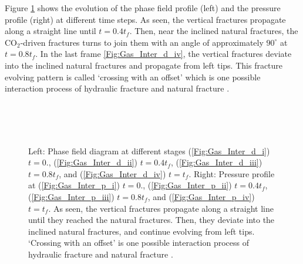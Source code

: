 {Figure \ref{Fig:Gas_Inter_snapshots} shows the evolution of the phase field profile (left) and the pressure profile (right) at different time steps. As seen, the vertical fractures propagate along a straight line until $t=0.4t_f$. Then, near the inclined natural fractures, the CO$_2$-driven fractures turns to join them with an angle of approximately $90^{\circ}$ at $t=0.8t_f$. In the last frame \ref{Fig:Gas_Inter_d_iv}, the vertical fractures deviate into the inclined natural fractures and propagate from left tips. This fracture evolving pattern is called `crossing with an offset' which is one possible interaction process of hydraulic fracture and natural fracture \cite{yew2014mechanics}.}

\begin{figure}[htbp]
\centering %
\\
\\
\\
\caption{{Left: Phase field diagram at different stages (\ref{Fig:Gas_Inter_d_i}) $t=0.$, (\ref{Fig:Gas_Inter_d_ii}) $t=0.4t_f$, (\ref{Fig:Gas_Inter_d_iii}) $t=0.8t_f$, and (\ref{Fig:Gas_Inter_d_iv}) $t=t_f$. Right: Pressure profile at (\ref{Fig:Gas_Inter_p_i}) $t=0.$, (\ref{Fig:Gas_Inter_p_ii}) $t=0.4t_f$, (\ref{Fig:Gas_Inter_p_iii}) $t=0.8t_f$,  and (\ref{Fig:Gas_Inter_p_iv}) $t=t_f$. As seen, the vertical fractures propagate along a straight line until they reached the natural fractures. Then, they deviate into the inclined natural fractures, and continue evolving from left tips. `Crossing with an offset' is one possible interaction process of hydraulic fracture and natural fracture \cite{yew2014mechanics}.}}
\label{Fig:Gas_Inter_snapshots}
\end{figure}